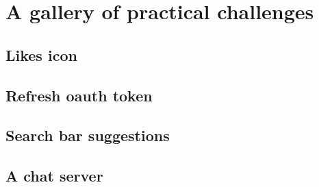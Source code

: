\chapter{A gallery of practical challenges}
\section{Likes icon}
\section{Refresh oauth token}
\section{Search bar suggestions}
\section{A chat server}
